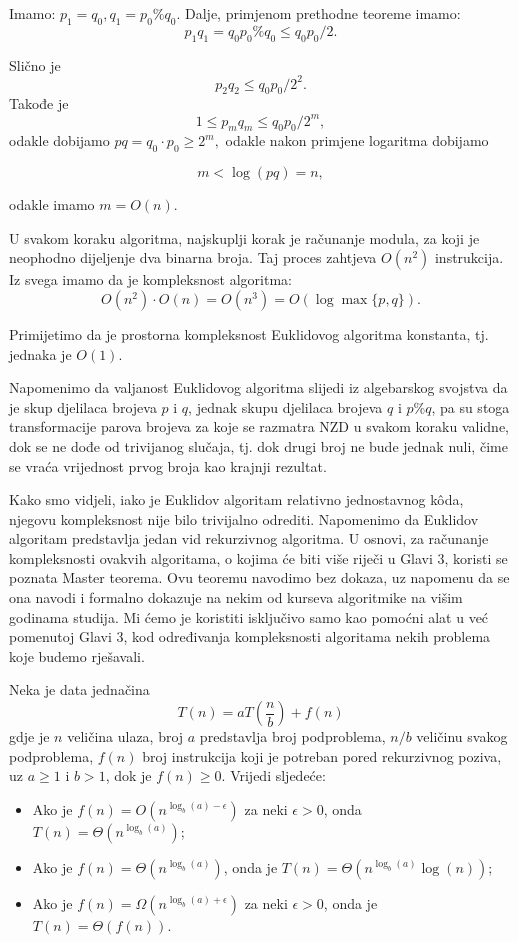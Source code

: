 \begin{example}
	Imamo: $p_1 = q_0, q_1 = p_0 \%q_0. $ Dalje, primjenom prethodne teoreme imamo: 
	$$ p_1 q_1 = q_0 p_0 \% q_0  \leq q_0 p_0 /2.$$
	
	Slično je 
		$$ p_2 q_2 \leq q_0 p_0 /2^2 .$$
Takođe je 
		$$ 1  \leq p_m q_m \leq q_0 p_0 /2^m, $$
odakle dobijamo $pq =  q_0 \cdot p_0 \geq 2^m, $ odakle nakon primjene logaritma dobijamo 

$$   m < \log (pq ) = n,$$

odakle imamo $m = O(n)$.

U svakom koraku algoritma, najskuplji korak je računanje modula, za koji je neophodno dijeljenje dva binarna broja. Taj proces zahtjeva $O(n^2)$ instrukcija. 
Iz svega imamo da je kompleksnost algoritma:
$$ O(n^2)\cdot O(n) = O(n^3)= O(\log \max\{p,q\}).$$

Primijetimo da je prostorna kompleksnost Euklidovog algoritma konstanta, tj. jednaka je $O(1)$. 
\end{example}


Napomenimo da valjanost Euklidovog algoritma slijedi iz algebarskog svojstva da je skup djelilaca brojeva $p$ i $q$, jednak skupu djelilaca brojeva $q$ i $p\%q$, pa su stoga transformacije parova brojeva za koje se razmatra NZD u svakom koraku validne, dok se ne dođe od trivijanog slučaja, tj. dok drugi broj ne bude jednak nuli, čime se vraća vrijednost prvog broja kao krajnji rezultat. 

Kako smo vidjeli, iako je Euklidov algoritam relativno jednostavnog k\^oda, njegovu kompleksnost nije bilo trivijalno odrediti. Napomenimo da Euklidov algoritam predstavlja jedan vid rekurzivnog algoritma.  %
 U osnovi, za računanje kompleksnosti ovakvih algoritama, o kojima će biti više riječi u Glavi 3, koristi se poznata Master teorema. Ovu teoremu navodimo bez dokaza, uz napomenu da se ona navodi i formalno dokazuje na nekim od kurseva algoritmike na višim godinama studija. Mi ćemo je koristiti isključivo samo kao pomoćni alat u već pomenutoj Glavi 3, kod određivanja kompleksnosti algoritama nekih problema koje budemo rješavali. 

\begin{theorem}
	Neka je data jednačina 
$$T(n) = aT\left(\frac{n}{b}\right) + f(n)$$
gdje je  $n$  veličina ulaza, broj $a$ predstavlja  broj podproblema,
$n/b$ veličinu svakog podproblema, $f(n)$ broj instrukcija koji je potreban pored rekurzivnog poziva, uz $a\geq 1$ i $b>1$, dok je $f(n)\geq 0$. Vrijedi sljedeće:
\begin{itemize}
	\item Ako je $f(n) = O(n^{\log_b (a) - \epsilon})$ za neki $\epsilon>0$, onda $ T(n) = \Theta (n^{\log_b (a)})$;
	\item Ako je $f(n) = \Theta (n^{\log_b (a)})$, onda je $T(n) = \Theta (n^{\log_b (a)} \log(n))$;
	\item Ako je $f(n) = \Omega (n^{\log_b (a) + \epsilon})$  za neki $\epsilon>0$, onda je $T(n) = \Theta (f(n))$. 
	
\end{itemize}
\end{theorem} 

